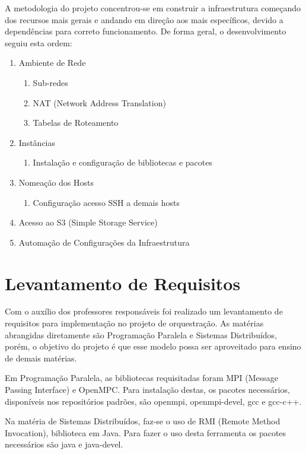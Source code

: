 \documentclass[tg]{mdtufsm}
\begin{document}
A metodologia do projeto concentrou-se em construir a infraestrutura começando dos recursos mais gerais e andando em direção aos mais específicos, devido a dependências para correto funcionamento. De forma geral, o desenvolvimento seguiu esta ordem:

\begin{enumerate}
	\item Ambiente de Rede
	\begin{enumerate}
		\item Sub-redes
		\item NAT (Network Address Translation)
		\item Tabelas de Roteamento
	\end{enumerate}
	\item Instâncias
	\begin{enumerate}
		\item Instalação e configuração de bibliotecas e pacotes
	\end{enumerate}
	\item Nomeação dos Hosts
	\begin{enumerate}
		\item Configuração acesso SSH a demais hosts
	\end{enumerate}
	\item Acesso ao S3 (Simple Storage Service)
	\item Automação de Configurações da Infraestrutura
\end{enumerate}


\section{Levantamento de Requisitos}

Com o auxílio dos professores responsáveis foi realizado um levantamento de requisitos para implementação no projeto de orquestração. As matérias abrangidas diretamente são Programação Paralela e Sistemas Distribuídos, porém, o objetivo do projeto é que esse modelo possa ser aproveitado para ensino de demais matérias.

Em Programação Paralela, as bibliotecas requisitadas foram MPI (Message Passing Interface) e OpenMPC. Para instalação destas, os pacotes necessários, disponíveis nos repositórios padrões, são openmpi, openmpi-devel, gcc e gcc-c++.

Na matéria de Sistemas Distribuídos, faz-se o uso de RMI (Remote Method Invocation), biblioteca em Java. Para fazer o uso desta ferramenta os pacotes necessários são java e java-devel.
\end{document}
